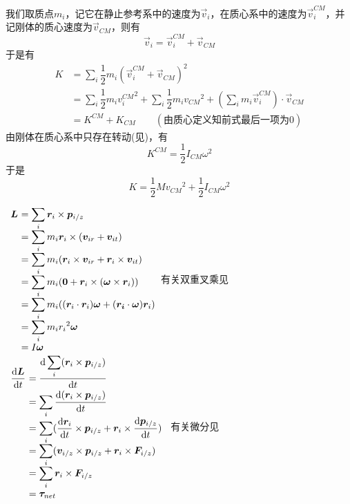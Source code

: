 \begin{prove}[\itr{Konig's Theorem}{柯尼希定理}\qquad$K=K_{CM}+K^{CM}$]
	我们取质点$m_i$，记它在静止参考系中的速度为$\vec{v}_i$，在质心系中的速度为$\vec{v}^{CM}_i$，并记刚体的质心速度为$\vec{v}_{CM}$，则有
	\[\vec{v}_i=\vec{v}_i^{CM}+\vec{v}_{CM}\]
	于是有
	\begin{align*}
		K&=\sum_i\dfrac{1}{2}m_i(\vec{v}_i^{CM}+\vec{v}_{CM})^2\\
		&=\sum_i\dfrac{1}{2}m_i{v_i^{CM}}^2+\sum_i\dfrac{1}{2}m_i{v_{CM}}^2+(\sum_im_i\vec{v}_i^{CM})\cdot\vec{v}_{CM}\\
		&=K^{CM}+K_{CM}\qquad(\text{由质心定义知前式最后一项为0})
	\end{align*}
	由刚体在质心系中只存在转动(见)，有
	\[K^{CM}=\dfrac{1}{2}I_{CM}\omega^2\]
	于是
	\[K=\dfrac{1}{2}M{v_{CM}}^2+\dfrac{1}{2}I_{CM}\omega^2\]
\end{prove}
\begin{prove}[Angular Momentum\qquad$\displaystyle\vec{L}=\sum_i\vec{r}_i\times\vec{p}_{i/z}=I\vec{\omega}\quad\&\quad\dfrac{\dif \vec{L}}{\dif t}=\vec{\tau}$]
	\qquad
	$
	\begin{array}{r@{\ }l}
		\vec{L}&=\displaystyle\sum_i\vec{r}_i\times\vec{p}_{i/z}\\
		&=\displaystyle\sum_im_i\vec{r}_i\times(\vec{v}_{ir}+\vec{v}_{it})\\
		&=\displaystyle\sum_im_i(\vec{r}_i\times\vec{v}_{ir}+\vec{r}_i\times\vec{v}_{it})\\
		&=\displaystyle\sum_im_i(\vec{0}+\vec{r}_i\times(\vec{\omega}\times\vec{r}_i))\\
		&=\displaystyle\sum_im_i((\vec{r}_i\cdot\vec{r}_i)\vec{\omega}+(\vec{r_i}\cdot\vec{\omega})\vec{r}_i)\\
		&=\displaystyle\sum_im_ir_i{}^2\vec{\omega}\\
		&=I\vec{\omega}
	\end{array}$有关双重叉乘见
	\\[2ex]
	\hspace*{0.9em}
	$
	\begin{array}{r@{\ }l}
		\dfrac{\dif\vec{L}}{\dif t}&=\dfrac{\dif\displaystyle\sum_i(\vec{r}_i\times\vec{p}_{i/z})}{\dif t}\\[1.4ex]
		&=\displaystyle\sum_i\dfrac{\dif(\vec{r}_i\times\vec{p}_{i/z})}{\dif t}\\
		&=\displaystyle\sum_i(\dfrac{\dif\vec{r}_i}{\dif t}\times\vec{p}_{i/z}+\vec{r}_i\times\dfrac{\dif\vec{p}_{i/z}}{\dif t})\\
		&=\displaystyle\sum_i(\vec{v}_{i/z}\times\vec{p}_{i/z}+\vec{r}_i\times\vec{F}_{i/z})\\
		&=\displaystyle\sum_i\vec{r}_i\times\vec{F}_{i/z}\\
		&=\vec{\tau}_{net}
	\end{array}$
	有关微分见
\end{prove}

